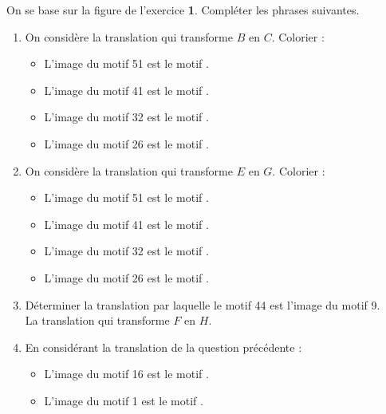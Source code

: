 \begin{corrige}
    On se base sur la figure de l'exercice {\bfseries 1}. Compléter les phrases suivantes.\\
    \begin{enumerate}
        \item On considère la translation qui transforme $B$ en $C$. Colorier  :
        \begin{itemize}
            \item L'image du motif \num{51} est le motif {}.
            \item L'image du motif \num{41} est le motif {}.
            \item L'image du motif \num{32} est le motif {}.
            \item L'image du motif \num{26} est le motif {}.
        \end{itemize}
        \item On considère la translation qui transforme $E$ en $G$. Colorier  :
        \begin{itemize}
            \item L'image du motif \num{51} est le motif {}.
            \item L'image du motif \num{41} est le motif {}.
            \item L'image du motif \num{32} est le motif {}.
            \item L'image du motif \num{26} est le motif {}.
        \end{itemize}
        \item Déterminer la translation par laquelle le motif \num{44} est l'image du motif \num{9}.\\
        {\red La translation qui transforme $F$ en $H$.}
        \item En considérant la translation de la question précédente :
        \begin{itemize}
            \item L'image du motif \num{16} est le motif {}.
            \item L'image du motif \num{1} est le motif {}.
        \end{itemize}
    \end{enumerate}
\end{corrige}

